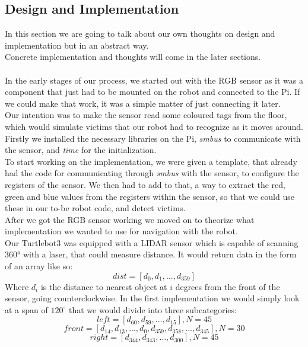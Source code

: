 \documentclass[conference]{IEEEtran}
\begin{document}
\subsection{Design and Implementation}\label{design}
In this section we are going to talk about our own thoughts on design and implementation but in an abstract way.\\
Concrete implementation and thoughts will come in the later sections. \\
\\
In the early stages of our process, we started out with the RGB sensor as it was a component that just had to be mounted 
on the robot and connected to the Pi. If we could make that work, it was a simple matter of just connecting it later.\\
Our intention was to make the sensor read some coloured tags from the floor, which would simulate victims that our robot 
had to recognize as it moves around.\\
Firstly we installed the necessary libraries on the Pi, \textit{smbus} to communicate with the sensor, and \textit{time} for 
the initialization. \\
To start working on the implementation, we were given a template, that already had the code for communicating through 
\textit{smbus} with the sensor, to configure the registers of the sensor. We then had to add to that, a way to extract the red, 
green and blue values from the registers within the sensor, so that we could use these in our to-be robot code, and detect 
victims.\\
After we got the RGB sensor working we moved on to theorize what implementation we wanted to use for navigation with the robot.\\
Our Turtlebot3 was equipped with a LIDAR sensor which is capable of scanning 360° with a laser, that could measure distance. 
It would return data in the form of an array like so:
\[dist = \left[d_0, d_1, ..., d_{359}\right]\]
Where $d_i$ is the distance to nearest object at $i$ degrees from the front of the sensor, going counterclockwise. 
In the first implementation we would simply look at a span of $120^{\circ}$ that we would divide into three subcategories:
\[left = \left[d_{60}, d_{59}, ..., d_{15}\right], N = 45\]
\[front = \left[d_{14}, d_{13}, ..., d_0, d_{359}, d_{358}, ..., d_{345}\right], N = 30\]
\[right = \left[d_{344}, d_{343}, ..., d_{300}\right], N = 45\]
\end{document}
